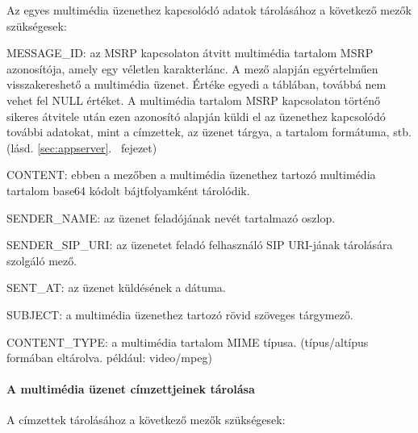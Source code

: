 Az  egyes multimédia üzenethez kapcsolódó adatok tárolásához a következő mezők szükségesek:

\begin{mydescription}
\item[MESSAGE\_ID:] az MSRP kapcsolaton átvitt multimédia tartalom MSRP azonosítója, amely egy véletlen karakterlánc. A mező alapján egyértelműen visszakereshető a multimédia üzenet. Értéke egyedi a táblában, továbbá nem vehet fel NULL értéket. A multimédia tartalom MSRP kapcsolaton történő sikeres átvitele után ezen azonosító alapján küldi el az üzenethez kapcsolódó további adatokat, mint a címzettek, az üzenet tárgya, a tartalom formátuma, stb. (lásd. \ref{sec:appserver}.~ fejezet) 
\item[CONTENT:] ebben a mezőben a multimédia üzenethez tartozó multimédia tartalom base64 kódolt bájtfolyamként tárolódik.
\item[SENDER\_NAME:] az üzenet feladójának nevét tartalmazó oszlop.
\item[SENDER\_SIP\_URI:] az üzenetet feladó felhasználó SIP URI-jának tárolására szolgáló mező.
\item[SENT\_AT:] az üzenet küldésének a dátuma. 
\item[SUBJECT:] a multimédia üzenethez tartozó rövid szöveges tárgymező.
\item[CONTENT\_TYPE:] a multimédia tartalom MIME típusa. (típus/altípus formában eltárolva. például: video/mpeg)
\end{mydescription}
\medskip

\paragraph*{A multimédia üzenet címzettjeinek tárolása\\}

A címzettek tárolásához a következő mezők szükségesek:

